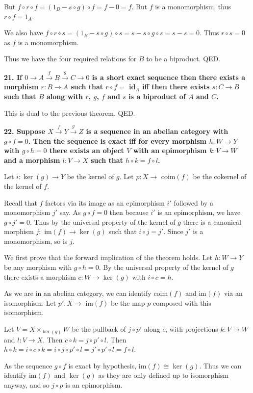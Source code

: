 \documentclass[12pt]{article}
\begin{document}
But $f\circ r\circ f = (1_B - s\circ g)\circ f = f - 0 = f$. But $f$ is a monomorphism, thus $r\circ f = 1_A$.

We also have $f\circ r\circ s = (1_B - s\circ g)\circ s = s - s\circ g\circ s = s - s = 0$. Thus $r\circ s = 0$ as $f$ is a monomorphism.

Thus we have the four required relations for $B$ to be a biproduct. QED.

\textbf{21. If $0 \rightarrow A \overset{f}{\rightarrow} B \overset{g}{\rightarrow} C \to 0$ is a short exact sequence then there exists a morphism $r : B \to A$  such that $r\circ f =$ id$_A$ iff then there exists $s : C \to B$ such that $B$ along with $r$, $g$, $f$ and $s$ is a biproduct of $A$ and $C$.}

This is dual to the previous theorem. QED.

\textbf{22. Suppose $X \overset{f}{\rightarrow} Y \overset{g}{\rightarrow} Z$ is a sequence in an abelian category with $g\circ f = 0$. Then the sequence is exact iff for every morphism $h : W \to Y$ with $g\circ h = 0$ there exists an object $V$ with an epimorphism $k : V \to W$ and a morphism $l : V \to X$ such that $h\circ k = f\circ l$.}

Let $i : \ker(g) \to Y$ be the kernel of $g$. Let $p : X \to$ coim$(f)$ be the cokernel of the kernel of $f$.

Recall that $f$ factors via its image as an epimorphism $i'$ followed by a monomorphism $j'$ say. As $g\circ f = 0$ then because $i'$ is an epimorphism, we have $g\circ j' = 0$. Thus by the universal property of the kernel of $g$ there is a canonical morphism $j :$ im$(f) \to \ker(g)$ such that $i\circ j = j'$. Since $j'$ is a monomorphism, so is $j$.

We first prove that the forward implication of the theorem holds. Let $h : W \to Y$ be any morphism with $g\circ h = 0$. By the universal property of the kernel of $g$ there exists a morphism $c : W \to \ker(g)$ with $i\circ c = h$.

As we are in an abelian category, we can identify coim$(f)$ and im$(f)$ via an isomorphism. Let $p' : X \to$ im$(f)$ be the map $p$ composed with this isomorphism.

Let $V = X\times_{\ker(g)} W$ be the pullback of $j\circ p'$ along $c$, with projections $k : V \to W$ and $l : V \to X$. Then $c\circ k = j\circ p'\circ l$. Then $h\circ k = i\circ c\circ k = i\circ j\circ p'\circ l = j'\circ p'\circ l = f\circ l$.

As the sequence $g\circ f$ is exact by hypothesis, im$(f) \cong \ker(g)$. Thus we can identify im$(f)$ and $\ker(g)$ as they are only defined up to isomorphism anyway, and so $j\circ p$ is an epimorphism.
\end{document}
